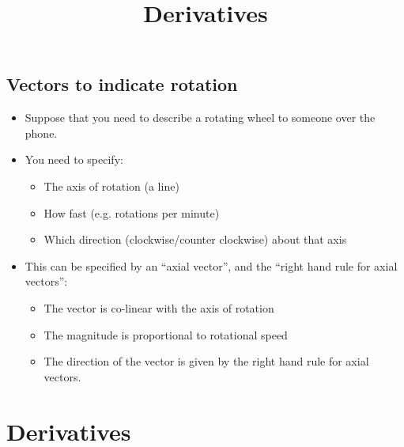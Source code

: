 \documentclass[aspectratio=169,
hyperref={colorlinks,urlcolor=blue}
]{beamer}
\begin{document}
\subsection{Vectors to indicate rotation}
\label{subsec:rotationvectors}
{
\begin{itemize}
\item Suppose that you need to describe a rotating wheel to someone over the phone.
\item You need to specify:
\begin{itemize}
\item The axis of rotation (a line)
\item How fast (e.g. rotations per minute)
\item Which direction (clockwise/counter clockwise) about that axis
\end{itemize}
\item This can be specified by an “axial vector”, and the “right hand rule for axial vectors”:
\begin{itemize}
\item The vector is co-linear with the axis of rotation
\item The magnitude is proportional to rotational speed
\item The direction of the vector is given by the right hand rule for axial vectors.
\end{itemize}
\end{itemize}
}
{
}
\section{Derivatives}
\label{sec:derivatives}
\title{Derivatives}
\author{\insertsubsection}


\begin{frame}
\titlepage
\thispagestyle{empty}
\end{frame}

\end{document}
